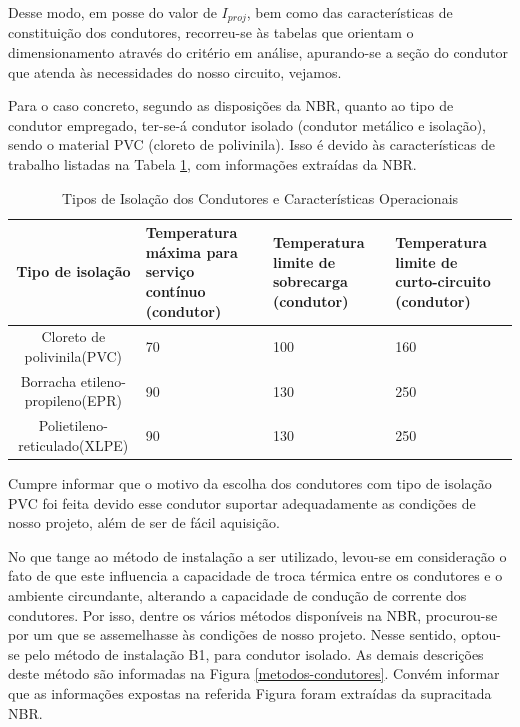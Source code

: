 Desse modo, em posse do valor de $I_{proj}$, bem como das características de constituição dos condutores, recorreu-se às tabelas que orientam o dimensionamento através do critério em análise, apurando-se a seção do condutor que atenda às necessidades do nosso circuito, vejamos.

Para o caso concreto, segundo as disposições da NBR, quanto ao tipo de condutor empregado, ter-se-á condutor isolado (condutor metálico e isolação), sendo o material PVC (cloreto de polivinila). Isso é devido às características de trabalho listadas na Tabela \ref{nbr}, com informações extraídas da NBR.

\begin{table}[h]
\centering
\begin{tabular}{| c | p{3cm} | p{3cm} | p{3cm} |}
\hline
\rowcolor[HTML]{329A9D} 
Tipo de isolação                & Temperatura máxima para serviço contínuo (condutor) & Temperatura limite de sobrecarga (condutor) & Temperatura limite de curto-circuito (condutor) \\ \hline
Cloreto de polivinila(PVC)      & 70                                                 & 100                                        & 160                                            \\ \hline
Borracha etileno-propileno(EPR) & 90                                                 & 130                                        & 250                                            \\ \hline
Polietileno-reticulado(XLPE)    & 90                                                 & 130                                        & 250                                           
\\ \hline
\end{tabular}
\caption{Tipos de Isolação dos Condutores e Características Operacionais}
\label{nbr}
\end{table}

Cumpre informar que o motivo da escolha dos condutores com tipo de isolação PVC foi feita devido esse condutor suportar adequadamente as condições de nosso projeto, além de ser de fácil aquisição.

No que tange ao método de instalação a ser utilizado, levou-se em consideração o fato de que este influencia a capacidade de troca térmica entre os condutores e o ambiente circundante, alterando a capacidade de condução de corrente dos condutores. Por isso, dentre os vários métodos disponíveis na NBR, procurou-se por um que se assemelhasse às condições de nosso projeto. Nesse sentido, optou-se pelo método de instalação B1, para condutor isolado. As demais descrições deste método são informadas na Figura \ref{metodos-condutores}. Convém informar que as informações expostas na referida Figura foram extraídas da supracitada NBR.


